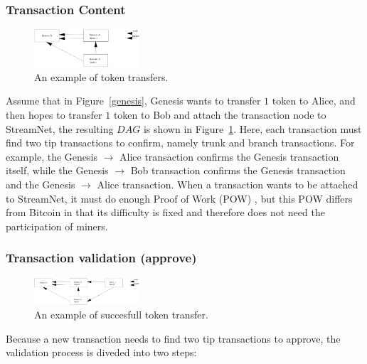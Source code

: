 \subsubsection{Transaction Content}

\begin{figure}[!ht]
\begin{center}
\includegraphics[width=0.35\textwidth]{figures/simple_transfer.eps}
    \caption{
        An example of token transfers.
     }
\label{simple_transfer}
\end{center}
\end{figure}

Assume that in Figure~\ref{genesis}, Genesis wants to transfer $1$ token to Alice, 
and then hopes to transfer $1$ token to Bob and attach the transaction node to StreamNet, the resulting $DAG$ is shown in Figure~\ref{simple_transfer}.
Here, each transaction must find two tip transactions to confirm, namely trunk and branch transactions.
For example, the Genesis $\rightarrow$ Alice transaction confirms the Genesis transaction itself,
while the Genesis $\rightarrow$ Bob transaction confirms the Genesis transaction and the Genesis $\rightarrow$ Alice transaction.
When a transaction wants to be attached to StreamNet, it must do enough Proof of Work (POW) \cite{pow_tangle},
but this POW differs from Bitcoin in that its difficulty is fixed and therefore does not need the participation of miners.

\subsubsection{Transaction validation (approve)}

\begin{figure}[!ht]
\begin{center}
\includegraphics[width=0.35\textwidth]{figures/txn_success.eps}
    \caption{
        An example of succesfull token transfer.
     }
\label{txn_success}
\end{center}
\end{figure}

Because a new transaction needs to find two tip transactions to approve, the validation process is diveded into two steps:

